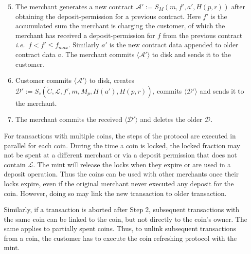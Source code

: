 \documentclass{llncs}
\begin{document}
\begin{enumerate}
  \setcounter{enumi}{4}
\item The merchant generates a new contract $ \mathcal{A}' := S_M(m, f', a', H(p,
  r)) $ after obtaining the deposit-permission for a previous contract.  Here
  $f'$ is the accumulated sum the merchant is charging the customer, of which
  the merchant has received a deposit-permission for $f$ from the previous
  contract \textit{i.e.}~$f <f' \leq f_{max}$.  Similarly $a'$ is the new
  contract data appended to older contract data $a$.
  The merchant commits $\langle \mathcal{A}' \rangle$ to disk and sends it to the customer.
\item Customer commits $\langle \mathcal{A}' \rangle$ to disk, creates
  $\mathcal{D}' := S_c(\widetilde{C}, \mathcal{L}, f', m, M_p, H(a'), H(p, r))$, commits
  $\langle \mathcal{D'} \rangle$ and sends it to the merchant.
\item The merchant commits the received $\langle \mathcal{D'} \rangle$ and
  deletes the older $\mathcal{D}$.
\end{enumerate}


For transactions with multiple coins, the steps of the protocol are
executed in parallel for each coin.  During the time a coin is locked,
the locked fraction may not be spent at a different merchant or via a
deposit permission that does not contain $\mathcal{L}$.  The mint will
release the locks when they expire or are used in a deposit operation.
Thus the coins can be used with other merchants once their locks
expire, even if the original merchant never executed any deposit for
the coin.  However, doing so may link the new transaction to older
transaction.

Similarly, if a transaction is aborted after Step 2, subsequent
transactions with the same coin can be linked to the coin, but not
directly to the coin's owner.  The same applies to partially spent
coins.  Thus, to unlink subsequent transactions from a coin, the
customer has to execute the coin refreshing protocol with the mint.
\end{document}
